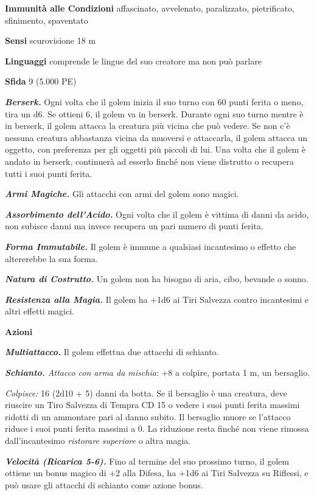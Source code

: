 \begin{multicols}{2}
\textbf{Immunità alle Condizioni} affascinato, avvelenato, paralizzato, pietrificato, sfinimento, spaventato

\textbf{Sensi} scurovisione 18 m

\textbf{Linguaggi} comprende le lingue del suo creatore ma non può parlare

\textbf{Sfida} 9 (5.000 PE)

\emph{\textbf{Berserk.}} Ogni volta che il golem inizia il suo turno con 60 punti ferita o meno, tira un d6. Se ottieni 6, il golem va in berserk. Durante ogni suo turno mentre è in berserk, il golem attacca la creatura più vicina che può vedere. Se non c'è nessuna creatura abbastanza vicina da muoversi e attaccarla, il golem attacca un oggetto, con preferenza per gli oggetti più piccoli di lui. Una volta che il golem è andato in berserk, continuerà ad esserlo finché non viene distrutto o recupera tutti i suoi punti ferita.

\emph{\textbf{Armi Magiche.}} Gli attacchi con armi del golem sono magici.

\emph{\textbf{Assorbimento dell'Acido.}} Ogni volta che il golem è vittima di danni da acido, non subisce danni ma invece recupera un pari numero di punti ferita. 

\emph{\textbf{Forma Immutabile.}} Il golem è immune a qualsiasi incantesimo o effetto che altererebbe la sua forma.

\emph{\textbf{Natura di Costrutto.}} Un golem non ha bisogno di aria, cibo, bevande o sonno.

\emph{\textbf{Resistenza alla Magia.}} Il golem ha +1d6 ai Tiri Salvezza contro incantesimi e altri effetti magici.

\textbf{Azioni}

\emph{\textbf{Multiattacco.}} Il golem effettua due attacchi di schianto.

\emph{\textbf{Schianto.} Attacco con arma da mischia}: +8 a colpire, portata 1 m, un bersaglio.

\emph{Colpisce:} 16 (2d10 + 5) danni da botta. Se il bersaglio è una creatura, deve riuscire un Tiro Salvezza di Tempra CD 15 o vedere i suoi punti ferita massimi ridotti di un ammontare pari al danno subito. Il bersaglio muore se l'attacco riduce i suoi punti ferita massimi a 0. La riduzione resta finché non viene rimossa dall'incantesimo \emph{ristorare superiore} o altra magia.

\emph{\textbf{Velocità (Ricarica 5-6).}} Fino al termine del suo prossimo turno, il golem ottiene un bonus magico di +2 alla Difesa, ha +1d6 ai Tiri Salvezza su Riflessi, e può usare gli attacchi di schianto come azione bonus.


\end{multicols}
